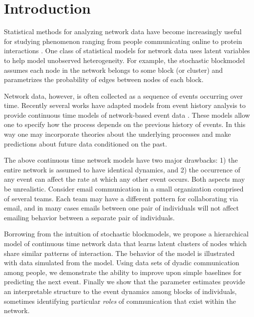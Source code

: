 \documentclass[11pt]{article}
\begin{document}
\section{Introduction}

Statistical methods for analyzing network data have become increasingly useful for studying  phenomenon ranging from people communicating online to protein interactions \cite{Goldenberg2009}. One class of statistical models for network data uses latent variables to help model unobserved heterogeneity.  For example, the stochastic blockmodel \cite{Nowicki2001, Kemp} assumes each node in the network belongs to some block (or cluster) and parametrizes the probability of edges between nodes of each block.  %

Network data, however, is often collected as a sequence of events occurring over time.   Recently several works have adapted models from event history analysis \cite{} to provide continuous time models of network-based event data \cite{Butts2008,Brandes2009,Perry2011,Stadtfeld2010,Stadtfeld2011,Opsahl2011,Vu2011,Vu2011a}.  These models allow one to specify how the process depends on the previous history of events.  In this way one may incorporate theories about the underlying processes and make predictions about future data conditioned on the past.

The above continuous time network models have two major drawbacks: 1) the entire network is assumed to have identical dynamics, and 2) the occurrence of any event can affect the rate at which any other event occurs.  Both aspects may be unrealistic.  Consider email communication in a small organization comprised of several teams.  Each team may have a different pattern for collaborating via email, and in many cases emails between one pair of individuals will not affect emailing behavior between a separate pair of individuals.

Borrowing from the intuition of stochastic blockmodels, we propose a hierarchical model of continuous time network data that learns latent clusters of nodes which share similar patterns of interaction.  The behavior of the model is illustrated with data simulated from the model.  Using  data sets of dyadic communication among people, we demonstrate the ability to improve upon simple baselines for predicting the next event.  Finally we show that the parameter estimates provide an interpretable structure to the event dynamics among blocks of individuals, sometimes identifying particular \emph{roles} of communication that exist within the network.
  
\end{document}
